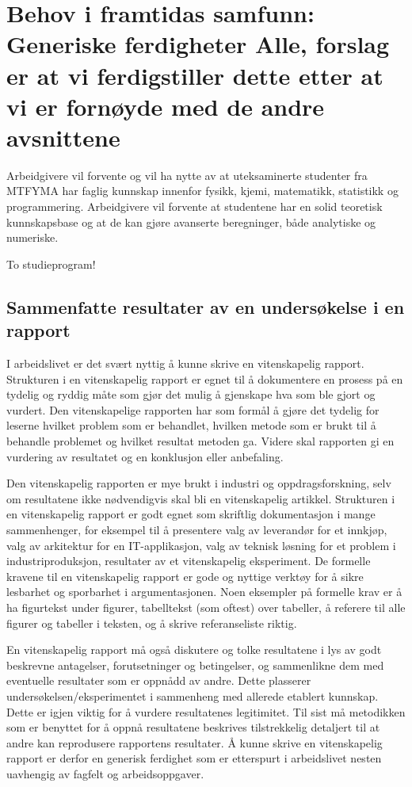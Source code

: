 \documentclass{article}
\begin{document}
\section{Behov i framtidas samfunn: Generiske ferdigheter {\color{red}Alle, forslag er at vi ferdigstiller dette etter at vi er fornøyde med de andre avsnittene}}
\label{Behov}
Arbeidgivere vil forvente og vil ha nytte av at uteksaminerte studenter fra MTFYMA har faglig kunnskap innenfor fysikk, kjemi, matematikk, statistikk og programmering.
Arbeidgivere vil forvente at studentene har en solid teoretisk kunnskapsbase og at de kan gjøre avanserte beregninger, både analytiske og numeriske.

To studieprogram!

\subsection{Sammenfatte resultater av en undersøkelse i en rapport}
I arbeidslivet er det svært nyttig å kunne skrive en vitenskapelig rapport.
Strukturen i en vitenskapelig rapport er egnet til å dokumentere en prosess på en tydelig og ryddig måte som gjør det mulig å gjenskape hva som ble gjort og vurdert.
Den vitenskapelige rapporten har som formål å gjøre det tydelig for leserne hvilket problem som er behandlet, hvilken metode som er brukt til å behandle problemet og hvilket resultat metoden ga.
Videre skal rapporten gi en vurdering av resultatet og en konklusjon eller anbefaling.

Den vitenskapelig rapporten er mye brukt i industri og oppdragsforskning, selv om resultatene ikke nødvendigvis skal bli en vitenskapelig artikkel.
Strukturen i en vitenskapelig rapport er godt egnet som skriftlig dokumentasjon i mange sammenhenger, for eksempel til å presentere valg av leverandør for et innkjøp, valg av arkitektur for en IT-applikasjon, valg av teknisk løsning for et problem i industriproduksjon, resultater av et vitenskapelig eksperiment.
De formelle kravene til en vitenskapelig rapport er gode og nyttige verktøy for å sikre lesbarhet og sporbarhet i argumentasjonen.
Noen eksempler på formelle krav er å ha figurtekst under figurer, tabelltekst {\color{red}(som oftest)} over tabeller, å referere til alle figurer og tabeller i teksten, og å skrive referanseliste riktig.

En vitenskapelig rapport må også diskutere og tolke resultatene i lys av godt beskrevne antagelser,  forutsetninger og betingelser, og sammenlikne dem med eventuelle resultater som er oppnådd av andre.
Dette plasserer undersøkelsen/eksperimentet i sammenheng med allerede etablert kunnskap.
Dette er igjen viktig for å vurdere resultatenes legitimitet.
Til sist må metodikken som er benyttet for å oppnå resultatene beskrives tilstrekkelig detaljert til at andre kan reprodusere rapportens resultater.
Å kunne skrive en vitenskapelig rapport er derfor en generisk ferdighet som er etterspurt i arbeidslivet nesten uavhengig av fagfelt og arbeidsoppgaver.
\end{document}
